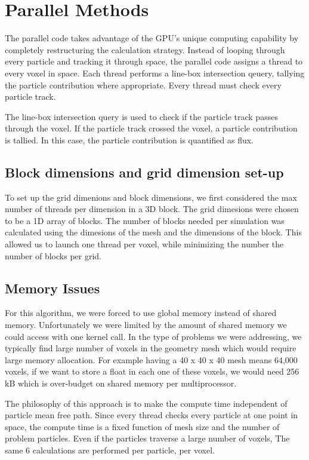 \section{Parallel Methods}
The parallel code takes advantage of the GPU's unique computing capability by
completely restructuring the calculation strategy. Instead of looping through
every particle and tracking it through space, the parallel code assigns a thread
to every voxel in space. Each thread performs a line-box intersection qeuery,
tallying the particle contribution where appropriate\cite{ray_trace}. Every
thread must check every particle track. 

The line-box intersection query is used to check if the particle track passes 
through the voxel. If the particle track crossed the voxel, a particle contribution 
is tallied. In this case, the particle contribution is quantified as flux. 

\subsection{Block dimensions and grid dimension set-up}
To set up the grid dimenions and block dimensions, we first considered the max number of 
threads per dimension in a 3D block. 
The grid dimesions were chosen to be a 1D array of blocks. The number of blocks 
needed per simulation was calculated using the dimesions of the mesh and the 
dimensions of the block. This allowed us to launch one thread per voxel, while 
minimizing the number the number of blocks per grid. 

\subsection{Memory Issues}
For this algorithm, we were forced to use global memory instead of shared memory. 
Unfortunately we were limited by the amount of shared memory we 
could access with one kernel call. In the type of problems we were addressing, 
we typically find large number of voxels in the geometry mesh which would require 
large memory allocation. For example having a 40 x 40 x 40 mesh means 64,000 
voxels, if we want to store a float in each one of these voxels, we would need 
256 kB which is over-budget on shared memory per multiprocessor.   


The philosophy of this approach is to make the compute time independent of
particle mean free path. Since every thread checks every particle at one point
in space, the compute time is a fixed function of mesh size and the number of
problem particles. Even if the particles traverse a large number of voxels, The
same 6 calculations are performed per particle, per voxel.
